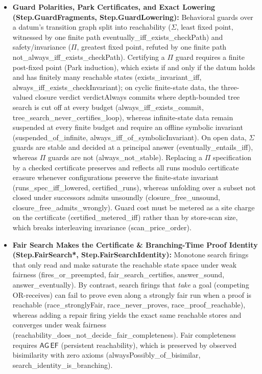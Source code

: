 \documentclass[11pt,a4paper]{article}
\theoremstyle{definition}
\DeclareRobustCommand{\lean}[1]{%
  \ifmmode\text{\normalfont\ttfamily\footnotesize\detokenize{#1}}%
  \else{\normalfont\footnotesize\leanurl{#1}}\fi}
\def\lean#1{#1}%
\begin{document}
\begin{itemize}[leftmargin=1.8em, nosep]
  \item \textbf{Guard Polarities, Park Certificates, and Exact Lowering (\lean{Step.GuardFragments}, \lean{Step.GuardLowering}):} Behavioral guards over a datum's transition graph split into reachability ($\Sigma$, least fixed point, witnessed by one finite path \lean{eventually_iff_exists_checkPath}) and safety/invariance ($\Pi$, greatest fixed point, refuted by one finite path \lean{not_always_iff_exists_checkPath}). Certifying a $\Pi$ guard requires a finite post-fixed point (Park induction), which exists if and only if the datum holds and has finitely many reachable states (\lean{exists_invariant_iff}, \lean{always_iff_exists_checkInvariant}); on cyclic finite-state data, the three-valued closure verdict \lean{verdictAlways} commits where depth-bounded tree search is cut off at every budget (\lean{always_iff_exists_commit}, \lean{tree_search_never_certifies_loop}), whereas infinite-state data remain suspended at every finite budget and require an offline symbolic invariant (\lean{suspended_of_infinite}, \lean{always_iff_of_symbolicInvariant}). On open data, $\Sigma$ guards are stable and decided at a principal answer (\lean{eventually_entails_iff}), whereas $\Pi$ guards are not (\lean{always_not_stable}). Replacing a $\Pi$ specification by a checked certificate preserves and reflects all runs modulo certificate erasure whenever configurations preserve the finite-state invariant (\lean{runs_spec_iff_lowered}, \lean{certified_runs}), whereas unfolding over a subset not closed under successors admits unsoundly (\lean{closure_free_unsound}, \lean{closure_free_admits_wrongly}). Guard cost must be metered as a site charge on the certificate (\lean{certified_metered_iff}) rather than by store-scan size, which breaks interleaving invariance (\lean{scan_price_order}).
  \item \textbf{Fair Search Makes the Certificate \& Branching-Time Proof Identity (\lean{Step.FairSearch*}, \lean{Step.FairSearchIdentity}):} Monotone search firings that only read and make saturate the reachable state space under weak fairness (\lean{fires_or_preempted}, \lean{fair_search_certifies}, \lean{answer_sound}, \lean{answer_eventually}). By contrast, search firings that \emph{take} a goal (competing OR-receives) can fail to prove even along a strongly fair run when a proof is reachable (\lean{race_stronglyFair}, \lean{race_never_proves}, \lean{race_proof_reachable}), whereas adding a repair firing yields the exact same reachable stores and converges under weak fairness (\lean{reachability_does_not_decide_fair_completeness}). Fair completeness requires $\mathsf{AG}\,\mathsf{EF}$ (persistent reachability), which is preserved by observed bisimilarity with zero axioms (\lean{alwaysPossibly_of_bisimilar}, \lean{search_identity_is_branching}).
\end{itemize}
\end{document}

